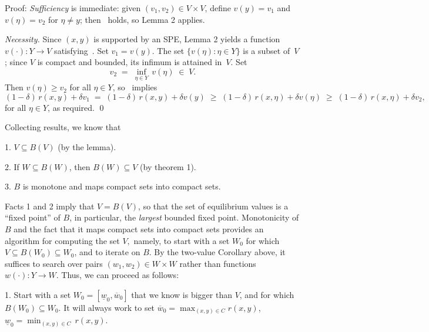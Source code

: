 \medskip\noindent
{\sc Proof:}
{\sl Sufficiency\/} is immediate: given $(v_1,v_2)\in V\times V$,
define $v(y)=v_1$ and $v(\eta)=v_2$ for $\eta\neq y$; then~ holds,
so Lemma 2 applies.

\medskip
{\sl Necessity.\/}
Since $(x,y)$ is supported by an SPE, Lemma 2 yields a
function $v(\cdot):Y\to V$ satisfying~.  Set $v_1=v(y)$.  The
set $\{v(\eta):\eta\in Y\}$ is a subset of~$V$; since $V$ is compact
 and bounded, its infimum is attained in~$V$.
Set
$$  v_2 \;=\; \inf_{\eta\in Y}\,v(\eta) \;\in\; V .  $$
Then $v(\eta)\geq v_2$ for all $\eta\in Y$, so~ implies
$$  (1-\delta)\,r(x,y)+\delta v_1
    \;=\; (1-\delta)\,r(x,y)+\delta v(y)
    \;\geq\; (1-\delta)\,r(x,\eta)+\delta v(\eta)
    \;\geq\; (1-\delta)\,r(x,\eta)+\delta v_2 ,  $$
for all $\eta\in Y$, as required.
\qed






%

Collecting results, we know that
\medskip
\item{1.} $V\subseteq B(V)$ (by the lemma).
\smallskip
\item{2.} If $W\subseteq B(W)$, then $B(W) \subseteq V$ (by theorem 1).
\smallskip
\item{3.}  $B$ is monotone and maps compact sets into compact sets.
\medskip

\noindent Facts 1 and 2 imply that $V=B(V)$, so that the set of
equilibrium values is a ``fixed point''
 of $B$, in particular, the {\it largest\/} bounded fixed
 point.
  Monotonicity of $B$ and the
fact that it maps compact sets into compact sets provides an
algorithm for computing the set $V,$ namely, to start with a set
$W_0$ for which $V \subseteq B(W_0)  \subseteq W_0$,  and to iterate
 on $B$. By the two-value Corollary above, it suffices to search over pairs
$(w_1,w_2)\in W\times W$ rather than  functions $w(\cdot):Y\to W$.
Thus, we can proceed as follows:

\medskip

\item{1.}  Start with a set $W_0 = [\underline{w}_0,\overline w_0]$ that
we know is bigger than $V$, and for which
$B(W_0) \subseteq W_0$.  It will always work to set $\overline w_0 =
\max_{(x,y)\in C}
 r(x,y)$, $\underline{w}_0=\min_{(x,y)\in C} \, r(x,y)$.
\medskip

